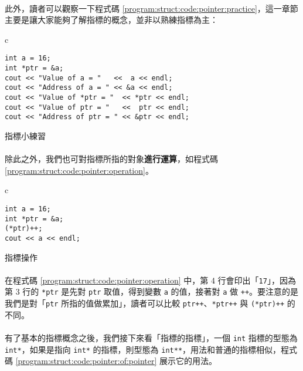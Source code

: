\documentclass[12pt,a4paper,oneside]{report}
\begin{document}
\begin{CJK}{UTF8}{bkai}
\paragraph{}此外，讀者可以觀察一下程式碼 \ref{program:struct:code:pointer:practice}，這一章節主要是讓大家能夠了解指標的概念，並非以熟練指標為主：

\begin{code}[h!]
  \centering
  \begin{tabular}{c}
  \begin{lstlisting}
int a = 16;
int *ptr = &a;
cout << "Value of a = "   <<  a << endl;
cout << "Address of a = " << &a << endl;
cout << "Value of *ptr = "  << *ptr << endl;
cout << "Value of ptr = "   <<  ptr << endl;
cout << "Address of ptr = " << &ptr << endl;
  \end{lstlisting}
  \end{tabular}
  \caption{指標小練習}
  \label{program:struct:code:pointer:practice}
\end{code}

\paragraph{}除此之外，我們也可對指標所指的對象\textbf{進行運算}，如程式碼 \ref{program:struct:code:pointer:operation}。

\begin{code}[h!]
\centering
\begin{tabular}{c}
\begin{lstlisting}
int a = 16;
int *ptr = &a;
(*ptr)++;
cout << a << endl;
\end{lstlisting}
\end{tabular}
\caption{指標操作}
\label{program:struct:code:pointer:operation}
\end{code}

\paragraph{}在程式碼 \ref{program:struct:code:pointer:operation} 中，第 4 行會印出「\lstinline!17!」，因為第 3 行的 \lstinline!*ptr! 是先對 \lstinline!ptr! 取值，得到變數 \lstinline!a! 的值，接著對 \lstinline!a! 做 \lstinline!++!。要注意的是我們是對「\lstinline!ptr! 所指的值做累加」，讀者可以比較 \lstinline!ptr++!、\lstinline!*ptr++! 與 \lstinline!(*ptr)++! 的不同。

\paragraph{}有了基本的指標概念之後，我們接下來看「指標的指標」，一個 \lstinline!int! 指標的型態為 \lstinline!int*!，如果是指向 \lstinline!int*! 的指標，則型態為 \lstinline!int**!，用法和普通的指標相似，程式碼 \ref{program:struct:code:pointer:of:pointer} 展示它的用法。


\end{CJK}
\end{document}
